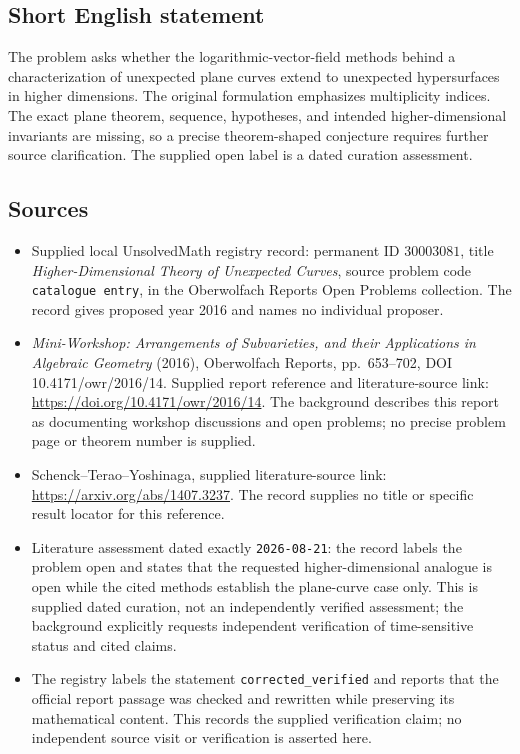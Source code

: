 \documentclass[11pt]{article}
\begin{document}
\subsection{Short English statement}
The problem asks whether the logarithmic-vector-field methods behind a characterization of unexpected plane curves extend to unexpected hypersurfaces in higher dimensions. The original formulation emphasizes multiplicity indices. The exact plane theorem, sequence, hypotheses, and intended higher-dimensional invariants are missing, so a precise theorem-shaped conjecture requires further source clarification. The supplied open label is a dated curation assessment.
\subsection{Sources}
\begin{itemize}
\item Supplied local UnsolvedMath registry record: permanent ID \(30003081\), title \emph{Higher-Dimensional Theory of Unexpected Curves}, source problem code \texttt{catalogue entry}, in the Oberwolfach Reports Open Problems collection. The record gives proposed year 2016 and names no individual proposer.
\item \emph{Mini-Workshop: Arrangements of Subvarieties, and their Applications in Algebraic Geometry} (2016), Oberwolfach Reports, pp.~653--702, DOI 10.4171/owr/2016/14. Supplied report reference and literature-source link: \url{https://doi.org/10.4171/owr/2016/14}. The background describes this report as documenting workshop discussions and open problems; no precise problem page or theorem number is supplied.
\item Schenck--Terao--Yoshinaga, supplied literature-source link: \url{https://arxiv.org/abs/1407.3237}. The record supplies no title or specific result locator for this reference.
\item Literature assessment dated exactly \texttt{2026-08-21}: the record labels the problem open and states that the requested higher-dimensional analogue is open while the cited methods establish the plane-curve case only. This is supplied dated curation, not an independently verified assessment; the background explicitly requests independent verification of time-sensitive status and cited claims.
\item The registry labels the statement \texttt{corrected\_verified} and reports that the official report passage was checked and rewritten while preserving its mathematical content. This records the supplied verification claim; no independent source visit or verification is asserted here.
\end{itemize}
\end{document}
